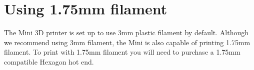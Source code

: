 


\section{Using 1.75mm filament}

The Mini 3D printer is set up to use 3mm plastic filament by default. Although we recommend using 3mm filament, the Mini is also capable of printing 1.75mm filament. To print with 1.75mm filament you will need to purchase a 1.75mm compatible Hexagon hot end.


